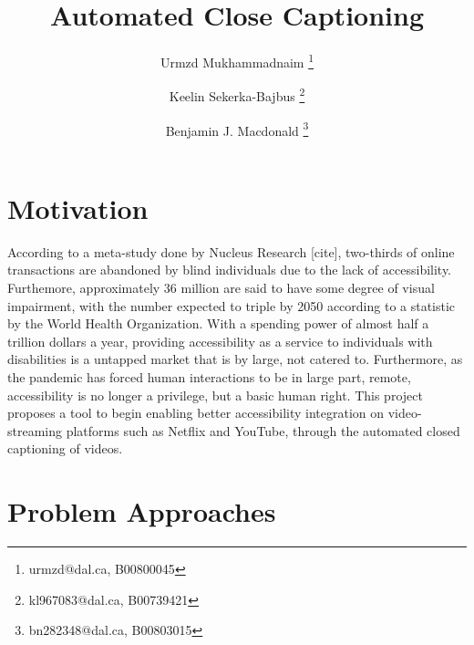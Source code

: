 \documentclass[11pt]{article}
\title{Automated Close Captioning}
\author[1]{Urmzd Mukhammadnaim \thanks{urmzd@dal.ca, B00800045}}
\author[1]{Keelin Sekerka-Bajbus \thanks{kl967083@dal.ca, B00739421 }}
\author[1]{Benjamin J. Macdonald \thanks{bn282348@dal.ca, B00803015}}
\affil[1]{Faculty of Computer Science, Dalhousie University}
\begin{document}
\maketitle

\section{Motivation}
According to a meta-study done by Nucleus Research [cite], two-thirds
of online transactions are abandoned by blind individuals due to the lack of accessibility.
Furthemore, approximately 36 million are said to have some degree of visual impairment, with the number
expected to triple by 2050 according to a statistic by the World Health Organization.
With a spending power of almost half a trillion dollars a year, providing accessibility
as a service to individuals with disabilities is a untapped market that is by large, not catered to.
Furthermore, as the pandemic has forced human interactions to be in large part, remote, accessibility is no longer
a privilege, but a basic human right. This project proposes a tool to begin enabling better accessibility
integration on video-streaming platforms such as Netflix and YouTube, through the automated
closed captioning of videos.

\section{Problem Approaches}
\end{document}
